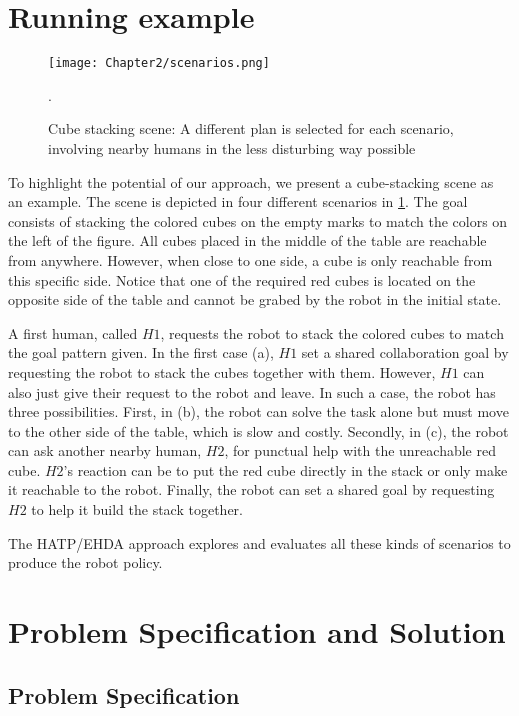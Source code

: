 \section{Running example}

\begin{figure}
    \centering
    \texttt{[image: Chapter2/scenarios.png]}
    \caption{Cube stacking scene: A different plan is selected for each scenario, involving nearby humans in the less disturbing way possible}.
    \label{fig:scenarios}
\end{figure}

To highlight the potential of our approach, we present a cube-stacking scene as an example. The scene is depicted in four different scenarios in \ref{fig:scenarios}. The goal consists of stacking the colored cubes on the empty marks to match the colors on the left of the figure. All cubes placed in the middle of the table are reachable from anywhere. However, when close to one side, a cube is only reachable from this specific side. Notice that one of the required red cubes is located on the opposite side of the table and cannot be grabed by the robot in the initial state.

A first human, called $H1$, requests the robot to stack the colored cubes to match the goal pattern given. In the first case (a), $H1$ set a shared collaboration goal by requesting the robot to stack the cubes together with them. However, $H1$ can also just give their request to the robot and leave. In such a case, the robot has three possibilities. First, in (b), the robot can solve the task alone but must move to the other side of the table, which is slow and costly. Secondly, in (c), the robot can ask another nearby human, $H2$, for punctual help with the unreachable red cube. $H2$'s reaction can be to put the red cube directly in the stack or only make it reachable to the robot. Finally, the robot can set a shared goal by requesting $H2$ to help it build the stack together. 

The HATP/EHDA approach explores and evaluates all these kinds of scenarios to produce the robot policy.


\section{Problem Specification and Solution}

\subsection{Problem Specification}


